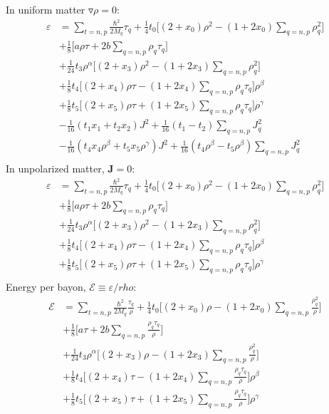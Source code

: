 \documentclass[preprint,prc,preprintnumbers,superscriptaddress,amsmath,amssymb,floatfix]{revtex4-1}
\begin{document}
In uniform matter $\triangledown \rho =0$:
\begin{equation}
 \begin{split}
  \varepsilon &= \sum_{t=n,p}\frac{\hbar^2}{2M_q}\tau_q+\frac{1}{4}t_0\Big[(2+x_0)\rho^2-(1+2x_0)\sum_{q=n,p}\rho^2_q\Big]\\
  &+\frac{1}{8}\Big[ a \rho \tau+2b\sum_{q=n,p}\rho_q \tau_q\Big]\\
  &+\frac{1}{24}t_3\rho^{\alpha}\Big[(2+x_3)\rho^2-(1+2x_3)\sum_{q=n,p}\rho_q^2\Big]\\
  &+\frac{1}{8}t_4\Big[ (2+x_4)\rho \tau-(1+2x_4)\sum_{q=n,p}\rho_q \tau_q\Big]\rho^{\beta}\\
 &+\frac{1}{8}t_5\Big[ (2+x_5)\rho \tau+(1+2x_5)\sum_{q=n,p}\rho_q \tau_q\Big]\rho^{\gamma}\\
 &-\frac{1}{16}(t_1x_1+t_2x_2)J^2+\frac{1}{16}(t_1-t_2)\sum_{q=n,p}J^2_q\\
 &-\frac{1}{16}(t_4 x_4\rho^{\beta}+t_5x_5\rho^{\gamma})J^2+\frac{1}{16}(t_4\rho^{\beta}-t_5\rho^{\beta})\sum_{q=n,p}J^2_q\\
 \end{split}
\end{equation}
In unpolarized matter, $\mathbf{J}=0$:
\begin{equation}
 \begin{split}
  \varepsilon &= \sum_{t=n,p}\frac{\hbar^2}{2M_q}\tau_q+\frac{1}{4}t_0\Big[(2+x_0)\rho^2-(1+2x_0)\sum_{q=n,p}\rho^2_q\Big]\\
  &+\frac{1}{8}\Big[ a \rho \tau+2b\sum_{q=n,p}\rho_q \tau_q\Big]\\
  &+\frac{1}{24}t_3\rho^{\alpha}\Big[(2+x_3)\rho^2-(1+2x_3)\sum_{q=n,p}\rho_q^2\Big]\\
  &+\frac{1}{8}t_4\Big[ (2+x_4)\rho \tau-(1+2x_4)\sum_{q=n,p}\rho_q \tau_q\Big]\rho^{\beta}\\
 &+\frac{1}{8}t_5\Big[ (2+x_5)\rho \tau+(1+2x_5)\sum_{q=n,p}\rho_q \tau_q\Big]\rho^{\gamma}\\
 \end{split}
 \label{eq:SkyrmeDFT}
\end{equation}
Energy per bayon, $\mathcal{E}\equiv \varepsilon/rho$:
\begin{equation}
 \begin{split}
  \mathcal{E}&= \sum_{t=n,p}\frac{\hbar^2}{2M_q}\frac{\tau_q}{\rho}+\frac{1}{4}t_0\Big[(2+x_0)\rho-(1+2x_0)\sum_{q=n,p}\frac{\rho^2_q}{\rho}\Big]\\
  &+\frac{1}{8}\Big[ a \tau+2b\sum_{q=n,p}\frac{\rho_q \tau_q}{\rho}\Big]\\
  &+\frac{1}{24}t_3\rho^{\alpha}\Big[(2+x_3)\rho-(1+2x_3)\sum_{q=n,p}\frac{\rho_q^2}{\rho}\Big]\\
  &+\frac{1}{8}t_4\Big[ (2+x_4) \tau-(1+2x_4)\sum_{q=n,p}\frac{\rho_q \tau_q}{\rho}\Big]\rho^{\beta}\\
 &+\frac{1}{8}t_5\Big[ (2+x_5) \tau+(1+2x_5)\sum_{q=n,p}\frac{\rho_q \tau_q}{\rho}\Big]\rho^{\gamma}\\
 \end{split}
\end{equation}
\end{document}
